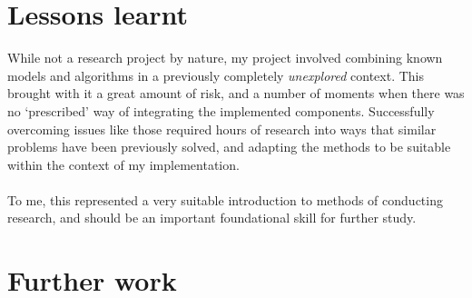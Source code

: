 \documentclass[12pt,a4paper,twoside,openright]{report}
\begin{document}
\section{Lessons learnt}

While not a research project by nature, my project involved combining known models and algorithms in a previously completely \emph{unexplored} context. This brought with it a great amount of risk, and a number of moments when there was no `prescribed' way of integrating the implemented components. Successfully overcoming issues like those required hours of research into ways that similar problems have been previously solved, and adapting the methods to be suitable within the context of my implementation.\\ \\
To me, this represented a very suitable introduction to methods of conducting research, and should be an important foundational skill for further study.

\section{Further work}
\end{document}
